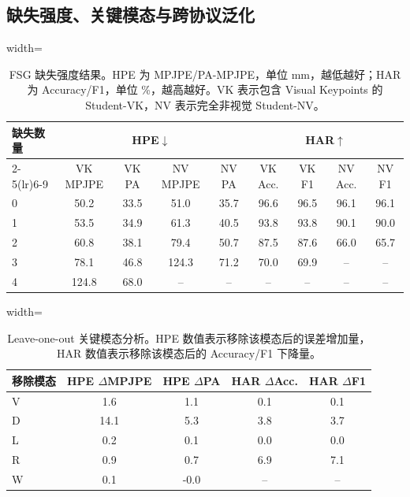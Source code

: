 \documentclass[journal]{IEEEtran}
\begin{document}
\subsection{缺失强度、关键模态与跨协议泛化}

\begin{table}[!t]
\centering
\caption{FSG 缺失强度结果。HPE 为 MPJPE/PA-MPJPE，单位 mm，越低越好；HAR 为 Accuracy/F1，单位 \%，越高越好。VK 表示包含 Visual Keypoints 的 Student-VK，NV 表示完全非视觉 Student-NV。}
\label{tab:severity_add}
\scriptsize
\begin{adjustbox}{width=\textwidth}
\begin{tabular}{lcccccccc}
\toprule
\multirow{2}{*}{缺失数量} & \multicolumn{4}{c}{HPE$\downarrow$} & \multicolumn{4}{c}{HAR$\uparrow$} \\
\cmidrule(lr){2-5}\cmidrule(lr){6-9}
 & VK MPJPE & VK PA & NV MPJPE & NV PA & VK Acc. & VK F1 & NV Acc. & NV F1 \\
\midrule
0 & 50.2 & 33.5 & 51.0 & 35.7 & 96.6 & 96.5 & 96.1 & 96.1 \\
1 & 53.5 & 34.9 & 61.3 & 40.5 & 93.8 & 93.8 & 90.1 & 90.0 \\
2 & 60.8 & 38.1 & 79.4 & 50.7 & 87.5 & 87.6 & 66.0 & 65.7 \\
3 & 78.1 & 46.8 & 124.3 & 71.2 & 70.0 & 69.9 & -- & -- \\
4 & 124.8 & 68.0 & -- & -- & -- & -- & -- & -- \\
\bottomrule
\end{tabular}
\end{adjustbox}
\end{table}

\begin{table}[!t]
\centering
\caption{Leave-one-out 关键模态分析。HPE 数值表示移除该模态后的误差增加量，HAR 数值表示移除该模态后的 Accuracy/F1 下降量。}
\label{tab:loo_add}
\scriptsize
\begin{adjustbox}{width=\linewidth}
\begin{tabular}{lcccc}
\toprule
移除模态 & HPE $\Delta$MPJPE & HPE $\Delta$PA & HAR $\Delta$Acc. & HAR $\Delta$F1 \\
\midrule
V & 1.6 & 1.1 & 0.1 & 0.1 \\
D & 14.1 & 5.3 & 3.8 & 3.7 \\
L & 0.2 & 0.1 & 0.0 & 0.0 \\
R & 0.9 & 0.7 & 6.9 & 7.1 \\
W & 0.1 & -0.0 & -- & -- \\
\bottomrule
\end{tabular}
\end{adjustbox}
\end{table}
\end{document}
